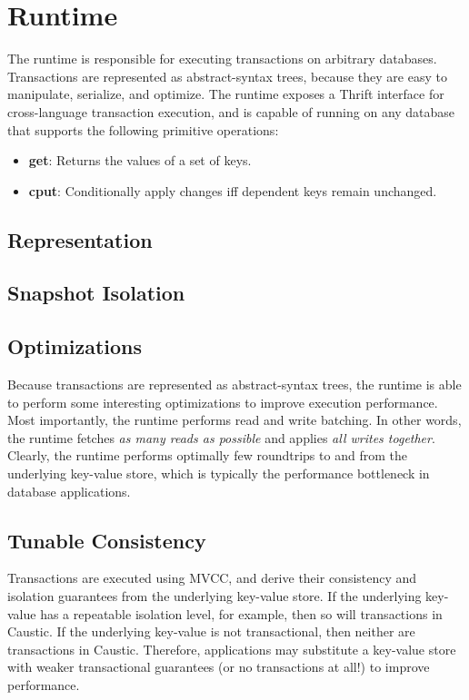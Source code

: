 \documentclass[journal]{../styles/IEEEtran}
\begin{document}
\section{Runtime}
The runtime is responsible for executing transactions on arbitrary databases. Transactions are represented as abstract-syntax trees, because they are easy to manipulate, serialize, and optimize. The runtime exposes a Thrift interface for cross-language transaction execution, and is capable of running on any database that supports the following primitive operations:

\begin{itemize}
  \item \textbf{get}: Returns the values of a set of keys.
  \item \textbf{cput}: Conditionally apply changes iff dependent keys remain unchanged.
\end{itemize}

\subsection{Representation}

\subsection{Snapshot Isolation}

\subsection{Optimizations}
Because transactions are represented as abstract-syntax trees, the runtime is able to perform some interesting optimizations to improve execution performance. Most importantly, the runtime performs read and write batching. In other words, the runtime fetches \emph{as many reads as possible} and applies \emph{all writes together}. Clearly, the runtime performs optimally few roundtrips to and from the underlying key-value store, which is typically the performance bottleneck in database applications. 

\subsection{Tunable Consistency}
Transactions are executed using MVCC, and derive their consistency and isolation guarantees from the underlying key-value store. If the underlying key-value has a repeatable isolation level, for example, then so will transactions in Caustic. If the underlying key-value is not transactional, then neither are transactions in Caustic. Therefore, applications may substitute a key-value store with weaker transactional guarantees (or no transactions at all!) to improve performance.
\end{document}
